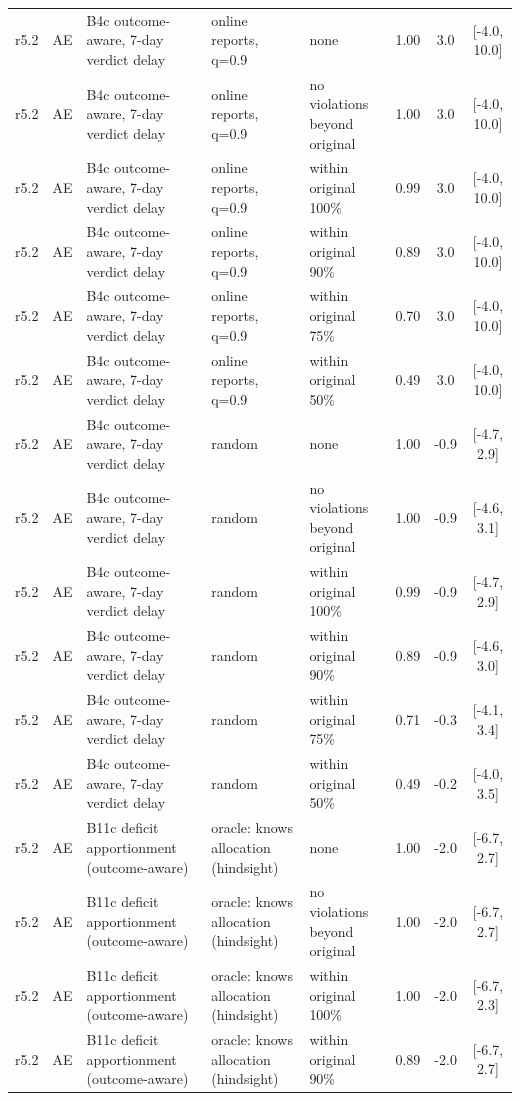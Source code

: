 \documentclass[10pt,onecolumn,letterpaper]{article}
\begin{document}
\begin{longtable}{lllp{4.2cm}p{3.4cm}ccc}
r5.2 & AE & B4c outcome-aware, 7-day verdict delay & online reports, q=0.9 & none & 1.00 & 3.0 & [-4.0, 10.0] \\
r5.2 & AE & B4c outcome-aware, 7-day verdict delay & online reports, q=0.9 & no violations beyond original & 1.00 & 3.0 & [-4.0, 10.0] \\
r5.2 & AE & B4c outcome-aware, 7-day verdict delay & online reports, q=0.9 & within original 100\% & 0.99 & 3.0 & [-4.0, 10.0] \\
r5.2 & AE & B4c outcome-aware, 7-day verdict delay & online reports, q=0.9 & within original 90\% & 0.89 & 3.0 & [-4.0, 10.0] \\
r5.2 & AE & B4c outcome-aware, 7-day verdict delay & online reports, q=0.9 & within original 75\% & 0.70 & 3.0 & [-4.0, 10.0] \\
r5.2 & AE & B4c outcome-aware, 7-day verdict delay & online reports, q=0.9 & within original 50\% & 0.49 & 3.0 & [-4.0, 10.0] \\
r5.2 & AE & B4c outcome-aware, 7-day verdict delay & random & none & 1.00 & -0.9 & [-4.7, 2.9] \\
r5.2 & AE & B4c outcome-aware, 7-day verdict delay & random & no violations beyond original & 1.00 & -0.9 & [-4.6, 3.1] \\
r5.2 & AE & B4c outcome-aware, 7-day verdict delay & random & within original 100\% & 0.99 & -0.9 & [-4.7, 2.9] \\
r5.2 & AE & B4c outcome-aware, 7-day verdict delay & random & within original 90\% & 0.89 & -0.9 & [-4.6, 3.0] \\
r5.2 & AE & B4c outcome-aware, 7-day verdict delay & random & within original 75\% & 0.71 & -0.3 & [-4.1, 3.4] \\
r5.2 & AE & B4c outcome-aware, 7-day verdict delay & random & within original 50\% & 0.49 & -0.2 & [-4.0, 3.5] \\
r5.2 & AE & B11c deficit apportionment (outcome-aware) & oracle: knows allocation (hindsight) & none & 1.00 & -2.0 & [-6.7, 2.7] \\
r5.2 & AE & B11c deficit apportionment (outcome-aware) & oracle: knows allocation (hindsight) & no violations beyond original & 1.00 & -2.0 & [-6.7, 2.7] \\
r5.2 & AE & B11c deficit apportionment (outcome-aware) & oracle: knows allocation (hindsight) & within original 100\% & 1.00 & -2.0 & [-6.7, 2.3] \\
r5.2 & AE & B11c deficit apportionment (outcome-aware) & oracle: knows allocation (hindsight) & within original 90\% & 0.89 & -2.0 & [-6.7, 2.7] \\

\end{longtable}
\end{document}
